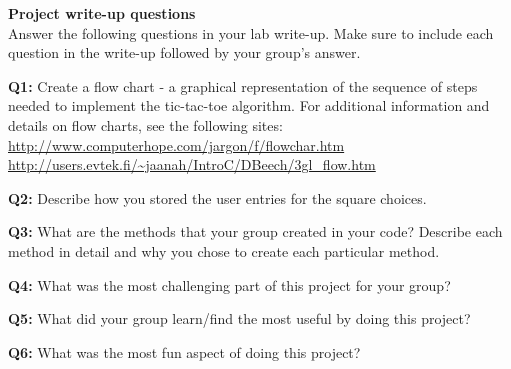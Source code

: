 \documentclass[12pt]{article}
\begin{document}
\vspace*{0.5cm}
\noindent\textbf{Project write-up questions}\\
Answer the following questions in your lab write-up. Make sure to include each question in the write-up followed by your group's answer.

\vspace*{0.5cm}
\noindent\textbf{Q1:} Create a flow chart - a graphical representation of the sequence of steps needed to implement the tic-tac-toe algorithm. For additional information and details on flow charts, see the following sites: \\
\url{http://www.computerhope.com/jargon/f/flowchar.htm}\\
\url{http://users.evtek.fi/~jaanah/IntroC/DBeech/3gl_flow.htm} 

\vspace*{0.5cm}
\noindent\textbf{Q2:} Describe how you stored the user entries for the square choices.

\vspace*{0.5cm}
\noindent\textbf{Q3:} What are the methods that your group created in your code? Describe each method in detail and why you chose to create each particular method.

\vspace*{0.5cm}
\noindent\textbf{Q4:} What was the most challenging part of this project for your group?

\vspace*{0.5cm}
\noindent\textbf{Q5:} What did your group learn/find the most useful by doing this project?

\vspace*{0.5cm}
\noindent\textbf{Q6:} What was the most fun aspect of doing this project?
	
\end{document}
